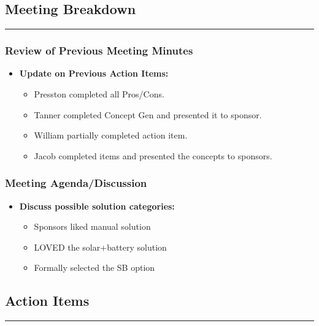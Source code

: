 \documentclass[12pt]{article}
\begin{document}
\subsection*{Meeting Breakdown}
\vspace{-1.3em}
\rule{\textwidth}{1pt}
\vspace{-2.3em}
\subsubsection*{Review of Previous Meeting Minutes}
\begin{itemize}[noitemsep, topsep=0pt]
    \item \textbf{Update on Previous Action Items:}
    \begin{itemize}[noitemsep, topsep=0pt]
        \item Presston completed all Pros/Cons. 
        \item Tanner completed Concept Gen and presented it to sponsor.
        \item William partially completed action item. 
        \item Jacob completed items and presented the concepts to sponsors.
    \end{itemize}
\end{itemize}

\subsubsection*{Meeting Agenda/Discussion}
\begin{itemize}[noitemsep, topsep=0pt]
    \item \textbf{Discuss possible solution categories:}
    \begin{itemize}[noitemsep, topsep=0pt]
        \item Sponsors liked manual solution
        \item LOVED the solar+battery solution
        \item Formally selected the SB option%
    \end{itemize}
\end{itemize}


\subsection*{Action Items}
\vspace{-1.3em}
\rule{\textwidth}{1pt}
\vspace{-1em}
\end{document}
